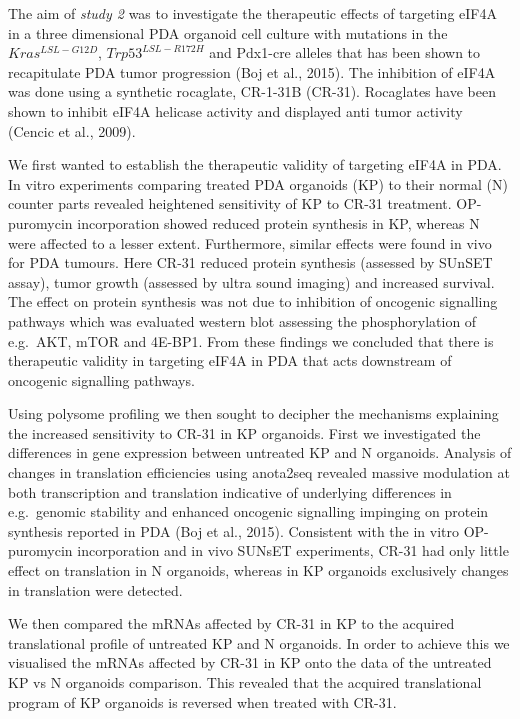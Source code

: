 \documentclass[
  12pt,
  openany]{book}
\begin{document}
The aim of \emph{study 2} was to investigate the therapeutic effects of targeting eIF4A in a three dimensional PDA organoid cell culture with mutations in the \(Kras^{LSL-G12D}\), \(Trp53^{LSL-R172H}\) and Pdx1-cre alleles that has been shown to recapitulate PDA tumor progression (Boj et al., 2015). The inhibition of eIF4A was done using a synthetic rocaglate, CR-1-31B (CR-31). Rocaglates have been shown to inhibit eIF4A helicase activity and displayed anti tumor activity (Cencic et al., 2009).

We first wanted to establish the therapeutic validity of targeting eIF4A in PDA. In vitro experiments comparing treated PDA organoids (KP) to their normal (N) counter parts revealed heightened sensitivity of KP to CR-31 treatment. OP-puromycin incorporation showed reduced protein synthesis in KP, whereas N were affected to a lesser extent. Furthermore, similar effects were found in vivo for PDA tumours. Here CR-31 reduced protein synthesis (assessed by SUnSET assay), tumor growth (assessed by ultra sound imaging) and increased survival. The effect on protein synthesis was not due to inhibition of oncogenic signalling pathways which was evaluated western blot assessing the phosphorylation of e.g.~AKT, mTOR and 4E-BP1. From these findings we concluded that there is therapeutic validity in targeting eIF4A in PDA that acts downstream of oncogenic signalling pathways.

Using polysome profiling we then sought to decipher the mechanisms explaining the increased sensitivity to CR-31 in KP organoids. First we investigated the differences in gene expression between untreated KP and N organoids. Analysis of changes in translation efficiencies using anota2seq revealed massive modulation at both transcription and translation indicative of underlying differences in e.g.~genomic stability and enhanced oncogenic signalling impinging on protein synthesis reported in PDA (Boj et al., 2015). Consistent with the in vitro OP-puromycin incorporation and in vivo SUNsET experiments, CR-31 had only little effect on translation in N organoids, whereas in KP organoids exclusively changes in translation were detected.

We then compared the mRNAs affected by CR-31 in KP to the acquired translational profile of untreated KP and N organoids. In order to achieve this we visualised the mRNAs affected by CR-31 in KP onto the data of the untreated KP vs N organoids comparison. This revealed that the acquired translational program of KP organoids is reversed when treated with CR-31.
\end{document}
